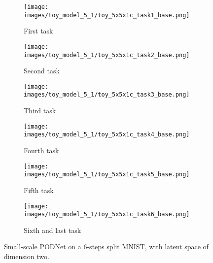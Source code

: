 \begin{figure}
    \centering
    \begin{subfigure}{.33\textwidth}
        \centering
        \texttt{[image: images/toy\_model\_5\_1/toy\_5x5x1c\_task1\_base.png]}
        \caption{First task}
        \label{fig:toy_6steps_base_1}
    \end{subfigure}%
    \begin{subfigure}{.33\textwidth}
        \centering
        \texttt{[image: images/toy\_model\_5\_1/toy\_5x5x1c\_task2\_base.png]}
        \caption{Second task}
        \label{fig:toy_6steps_base_2}
    \end{subfigure}
    \begin{subfigure}{.33\textwidth}
        \centering
        \texttt{[image: images/toy\_model\_5\_1/toy\_5x5x1c\_task3\_base.png]}
        \caption{Third task}
        \label{fig:toy_6steps_base_3}
    \end{subfigure}

    \begin{subfigure}{.33\textwidth}
        \centering
        \texttt{[image: images/toy\_model\_5\_1/toy\_5x5x1c\_task4\_base.png]}
        \caption{Fourth task}
        \label{fig:toy_6steps_base_4}
    \end{subfigure}
    \begin{subfigure}{.33\textwidth}
        \centering
        \texttt{[image: images/toy\_model\_5\_1/toy\_5x5x1c\_task5\_base.png]}
        \caption{Fifth task}
        \label{fig:toy_6steps_base_5}
    \end{subfigure}
    \begin{subfigure}{.30\textwidth}
        \centering
        \texttt{[image: images/toy\_model\_5\_1/toy\_5x5x1c\_task6\_base.png]}
        \caption{Sixth and last task}
        \label{fig:toy_6steps_base_6}
    \end{subfigure}

    \caption{Small-scale PODNet on a 6-steps split MNIST, with latent space of dimension two.}
    \label{fig:toy_6steps_base}
\end{figure}
